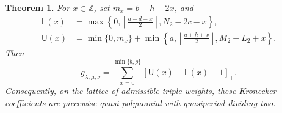 \documentclass[11pt,reqno]{amsart}
\numberwithin{equation}{section}
\newtheorem{theorem}{Theorem}[section]
\theoremstyle{remark}
\newcommand{\ZZ}{\mathbb{Z}}
\newcommand{\pos}[1]{\left[#1\right]_{+}}
\begin{document}
\begin{theorem}
\label{thm:closed-formula}
For $x\in\ZZ$, set $m_x=b-h-2x$, and
\begin{equation}
\label{eq:closed-sum-bounds}
 \begin{aligned}
 \mathsf L(x)&=\max\left\{
 0,\left\lceil\frac{a-d-x}{2}\right\rceil,N_2-2c-x
 \right\},\\
 \mathsf U(x)&=\min\{0,m_x\}
 +\min\left\{
 a,\left\lfloor\frac{a+h+x}{2}\right\rfloor,M_2-L_2+x
 \right\}.
 \end{aligned}
\end{equation}
Then
\begin{equation}
\label{eq:closed-Kronecker-sum}
 g_{\lambda,\mu,\nu}
 =\sum_{x=0}^{\min\{b,\rho\}}
   \pos{\mathsf U(x)-\mathsf L(x)+1}.
\end{equation}
Consequently, on the lattice of admissible triple weights, these Kronecker
coefficients are piecewise quasi-polynomial with quasiperiod dividing two.
\end{theorem}
\end{document}
